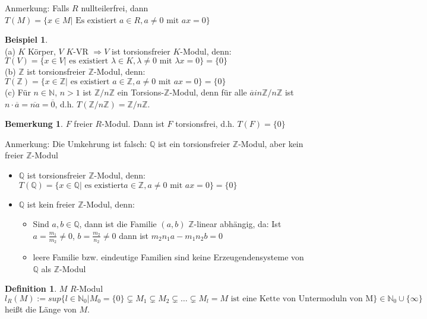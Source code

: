 \documentclass[10pt,a4paper,numbers=endperiod]{scrartcl}
\theoremstyle{definition}
\newtheorem{defi}[satz]{Definition}
\newtheorem{bem}[satz]{Bemerkung}
\newtheorem{bsp}[satz]{Beispiel}
\def\QQ{{\mathbb Q}}
\def\NN{{\mathbb N}}
\def\ZZ{{\mathbb Z}}
\begin{document}
Anmerkung: Falls $R$ nullteilerfrei, dann $T(M) = \{x \in M| \text{ Es existiert } a \in R, a \neq 0 \text{ mit } ax = 0\}$\

\begin{bsp}
	$ $\\
	(a) $K$ Körper, $V$ $K$-VR $\Rightarrow V$ ist torsionsfreier $K$-Modul, denn:\\
	$T(V) = \{x \in V| \text{ es existiert } \lambda \in K , \lambda \neq 0 \text{ mit } \lambda x = 0\} = \{0\}$\\
	(b) $\ZZ$ ist torsionsfreier $\ZZ$-Modul, denn:\\
	$T(\ZZ) = \{x \in \ZZ| \text{ es existiert } a \in \ZZ, a \neq 0 \text{ mit } ax = 0\} = \{0\}$\\
	(c) Für $n \in \NN$, $n > 1$ ist $\ZZ/n\ZZ$ ein Torsions-$\ZZ$-Modul, denn für alle $\overline{a} in \ZZ/n\ZZ$ ist $n \cdot \overline{a} = \overline{na} = \overline{0}$, d.h. $T(\ZZ/n\ZZ) = \ZZ/n\ZZ$.
\end{bsp}

\begin{bem}
	$F$ freier $R$-Modul. Dann ist $F$ torsionsfrei, d.h. $T(F) = \{0\}$ 
\end{bem}

Anmerkung: Die Umkehrung ist falsch: $\QQ$ ist ein torsionsfreier $\ZZ$-Modul, aber kein freier $\ZZ$-Modul
\begin{itemize}
	\item $\QQ$ ist torsionsfreier $\ZZ$-Modul, denn: $T(\QQ) = \{x \in \QQ| \text{ es existiert} a \in \ZZ, a \neq 0 \text{ mit } ax = 0\} = \{0\}$
	\item $\QQ$ ist kein freier $\ZZ$-Modul, denn:
	\begin{itemize}
		\item Sind $a, b \in \QQ$, dann ist die Familie $(a,b)$ $\ZZ$-linear abhängig, da: Ist $a = \frac{m_1}{m_2} \neq 0$, $b = \frac{m_2}{n_2}\neq 0$ dann ist $m_2n_1a - m_1n_2b = 0$
		\item leere Familie bzw. eindeutige Familien sind keine Erzeugendensysteme von $\QQ$ als $\ZZ$-Modul
	\end{itemize}
\end{itemize}

\begin{defi}
	$M$ $R$-Modul\\
	$l_R(M) := sup\{l \in \NN_0| M_0 = \{0\} \subsetneq M_1 \subsetneq M_2 \subsetneq \ldots \subsetneq M_l = M \text{ ist eine Kette von Untermoduln von M}\} \in \NN_0 \cup \{\infty\}$ heißt die Länge von $M$.
\end{defi}
\end{document}
